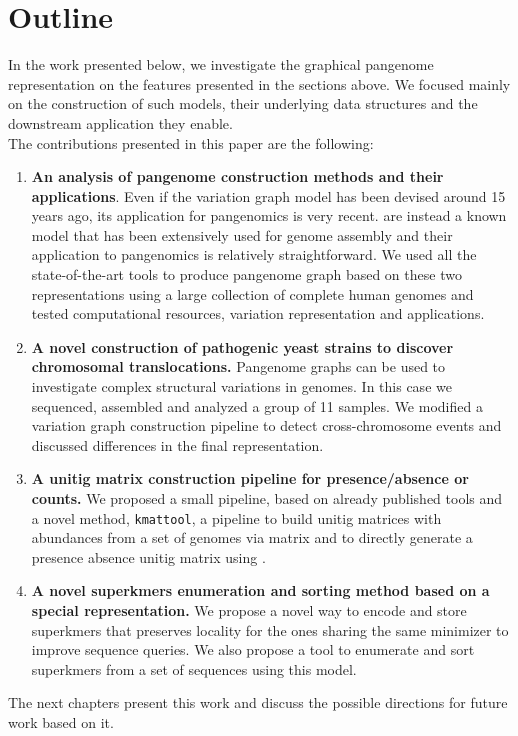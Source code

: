 \section{Outline}
In the work presented below, we investigate the graphical pangenome representation on the features presented in the sections above. We focused mainly on the construction of such models, their underlying data structures and the downstream application they enable.\\
The contributions presented in this paper are the following:
\begin{enumerate}
	\item \textbf{An analysis of pangenome construction methods and their applications}. Even if the variation graph model has been devised around 15 years ago, its application for pangenomics is very recent. \dbgs are instead a known model that has been extensively used for genome assembly and their application to pangenomics is relatively straightforward. We used all the state-of-the-art tools to produce pangenome graph based on these two representations using a large collection of complete human genomes and tested computational resources, variation representation and applications.
	\item  \textbf{A novel construction of pathogenic yeast strains to discover chromosomal translocations.} Pangenome graphs can be used to investigate complex structural variations in genomes. In this case we sequenced, assembled and analyzed a group of 11 samples. We modified a variation graph construction pipeline to detect cross-chromosome events and discussed differences in the final representation.
	\item \textbf{A unitig matrix construction pipeline for presence/absence or counts.} We proposed a small pipeline, based on already published tools and a novel method, \texttt{kmattool}, a pipeline to build unitig matrices with abundances from a set of genomes via \kmer matrix and to directly generate a presence absence unitig matrix using \ccdbgs. 
	\item  \textbf{A novel superkmers enumeration and sorting method based on a special representation.} We propose a novel way to encode and store superkmers that preserves locality for the ones sharing the same minimizer to improve sequence queries. We also propose a tool to enumerate and sort superkmers from a set of sequences using this model.
\end{enumerate}
The next chapters present this work and discuss the possible directions for future work based on it.

\printbibliography